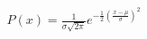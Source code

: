 \documentclass[preview]{standalone}
\begin{document}
\begin{align*}
P(x) = \frac{1}{\sigma\sqrt{2\pi}} e^{-\frac{1}{2}\left(\frac{x-\mu}{\sigma}\right)^2}
\end{align*}
\end{document}
